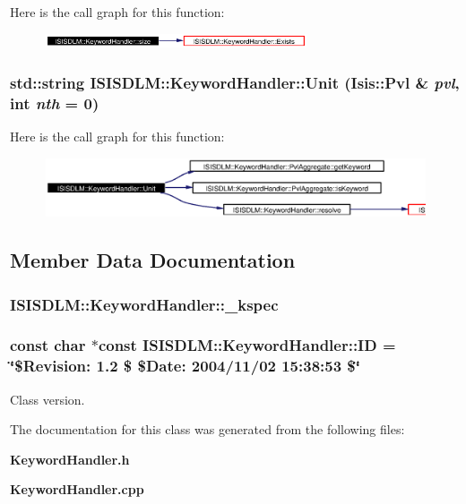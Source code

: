 Here is the call graph for this function:\begin{figure}[H]
\begin{center}
\leavevmode
\includegraphics[width=218pt]{classISISDLM_1_1KeywordHandler_a5_cgraph}
\end{center}
\end{figure}
\subsubsection{\setlength{\rightskip}{0pt plus 5cm}std::string ISISDLM::Keyword\-Handler::Unit (Isis::Pvl \& {\em pvl}, int {\em nth} = 0)}\label{classISISDLM_1_1KeywordHandler_a6}




Here is the call graph for this function:\begin{figure}[H]
\begin{center}
\leavevmode
\includegraphics[width=397pt]{classISISDLM_1_1KeywordHandler_a6_cgraph}
\end{center}
\end{figure}


\subsection{Member Data Documentation}
\subsubsection{ {\bf ISISDLM::Keyword\-Handler::\_\-kspec}\hspace{0.3cm}{\tt  [private]}}\label{classISISDLM_1_1KeywordHandler_r0}


\subsubsection{\setlength{\rightskip}{0pt plus 5cm}const char $\ast$const {\bf ISISDLM::Keyword\-Handler::ID} = \char`\"{}\$Revision: 1.2 \$ \$Date: 2004/11/02 15:38:53 \$\char`\"{}\hspace{0.3cm}{\tt  [static]}}\label{classISISDLM_1_1KeywordHandler_s0}


Class version. 



The documentation for this class was generated from the following files:\begin{CompactItemize}
\item 
{\bf Keyword\-Handler.h}\item 
{\bf Keyword\-Handler.cpp}\end{CompactItemize}
